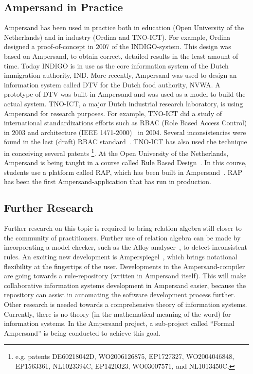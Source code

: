 \documentclass{svproc}
\begin{document}
\subsection{Ampersand in Practice}
\label{sct:Ampersand in practice}
	Ampersand has been used in practice both in education (Open University of the Netherlands)
	and in industry (Ordina and TNO-ICT).
	For example, Ordina designed a proof-of-concept in 2007 of the INDIGO-system.
	This design was based on Ampersand, to obtain correct, detailed results in the least amount of time.
	Today INDIGO is in use as the core information system of the Dutch immigration authority, IND.
	More recently, Ampersand was used to design an information system called DTV for the Dutch food authority, NVWA.
	A prototype of DTV was built in Ampersand and was used as a model to build the actual system.
	TNO-ICT, a major Dutch industrial research laboratory, is using Ampersand for research purposes.
	For example, TNO-ICT did a study of international standardizations efforts such as
	RBAC (Role Based Access Control) in 2003 and architecture (IEEE 1471-2000)~\cite{IEEE1471} in 2004.
	Several inconsistencies were found in the last (draft) RBAC standard~\cite{RBAC}.
	TNO-ICT has also used the technique in conceiving several patents%
\footnote{e.g. patents DE60218042D, WO2006126875, EP1727327, WO2004046848, EP1563361, NL1023394C, EP1420323, WO03007571, and NL1013450C.}.
	At the Open University of the Netherlands, Ampersand is being taught in a course called Rule Based Design~\cite{RBD}.
	In this course, students use a platform called RAP, which has been built in Ampersand~\cite{Michels2015}.
	RAP has been the first Ampersand-application that has run in production.

\subsection{Further Research}
\label{sct:Further Research}
	Further research on this topic is required to bring relation algebra still closer to the community of practitioners.
	Further use of relation algebra can be made by incorporating a model checker, such as the Alloy analyser~\cite{Alloy2006}, to detect inconsistent rules.
	An exciting new development is Amperspiegel~\cite{Amperspiegel}, which brings notational flexibility at the fingertips of the user.
	Developments in the Ampersand-compiler are going towards a rule-repository (written in Ampersand itself).
	This will make collaborative information systems development in Ampersand easier, because the repository can assist in automating
	the software development process further.
	Other research is needed towards a comprehensive theory of information systems.
	Currently, there is no theory (in the mathematical meaning of the word) for information systems.
	In the Ampersand project, a sub-project called ``Formal Ampersand'' is being conducted to achieve this goal.


\end{document}

